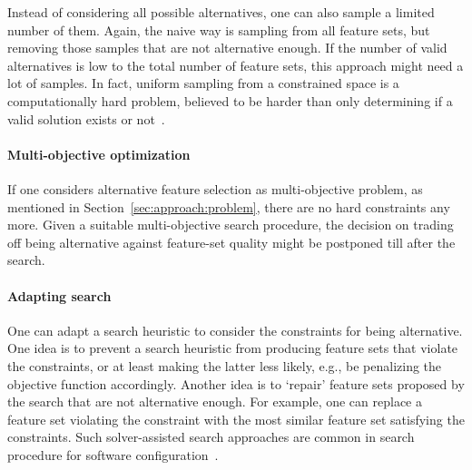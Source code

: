 \documentclass{article}
\theoremstyle{definition}
\begin{document}
Instead of considering all possible alternatives, one can also sample a limited number of them.
Again, the naive way is sampling from all feature sets, but removing those samples that are not alternative enough.
If the number of valid alternatives is low to the total number of feature sets, this approach might need a lot of samples.
In fact, uniform sampling from a constrained space is a computationally hard problem, believed to be harder than only determining if a valid solution exists or not~\cite{ermon2012uniform}.

\paragraph{Multi-objective optimization}

If one considers alternative feature selection as multi-objective problem, as mentioned in Section~\ref{sec:approach:problem}, there are no hard constraints any more.
Given a suitable multi-objective search procedure, the decision on trading off being alternative against feature-set quality might be postponed till after the search.

\paragraph{Adapting search}

One can adapt a search heuristic to consider the constraints for being alternative.
One idea is to prevent a search heuristic from producing feature sets that violate the constraints, or at least making the latter less likely, e.g., be penalizing the objective function accordingly.
Another idea is to `repair' feature sets proposed by the search that are not alternative enough.
For example, one can replace a feature set violating the constraint with the most similar feature set satisfying the constraints.
Such solver-assisted search approaches are common in search procedure for software configuration~\cite{white2010automated,henard2015combining,guo2018preserve}.
\end{document}
